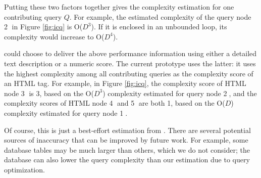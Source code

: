 Putting these two factors together gives \ToolP the complexity estimation
for one contributing query $Q$. For example, the estimated complexity of the 
query node {\large \textcircled{\small 2}} in Figure \ref{fig:icq} is O($D^3$). If it is
enclosed in an unbounded loop, its complexity would increase to O($D^4$).

\ToolP could choose to deliver the above performance information using either a 
detailed text description or a numeric score. The current prototype
uses the latter: it uses the highest 
complexity among all contributing queries as the complexity score of an
HTML tag. For example, in Figure \ref{fig:icq}, 
the complexity score of HTML node {\large \textcircled{\small 3}} is 3, based
on the O($D^3$) complexity estimated for query node  {\large \textcircled{\small 2}}, and
the complexity scores of HTML node {\large \textcircled{\small 4}} and  {\large \textcircled{\small 5}}  are
both 1, based on the O($D$) complexity estimated for query node
{\large \textcircled{\small 1}}.

Of course, this is just a best-effort estimation from \ToolP. There are 
several potential
sources of inaccuracy that can be improved by future work.
For example, some database tables may be much larger than others, which
we do not consider; the database can also lower the
query complexity than our estimation due to query optimization.

\iffalse
{\tt where}, 
{\tt all}, 
{\tt group}, 
{\tt join}, 
{\tt find}, 
{\tt includes}, 
{\tt teager\_load}, 
{\tt order}, 
{\tt count}, 
{\tt sum}, 
{\tt maximum}, 
{\tt minimum}, 
{\tt average}, 
{\tt having}, and 
{\tt calculate}. \cong{I think no need to mention query chain. Just say the SQL query type and how we estimate.}
\ToolP currently assigns equal cost scores for each such operator.
\fi



 
